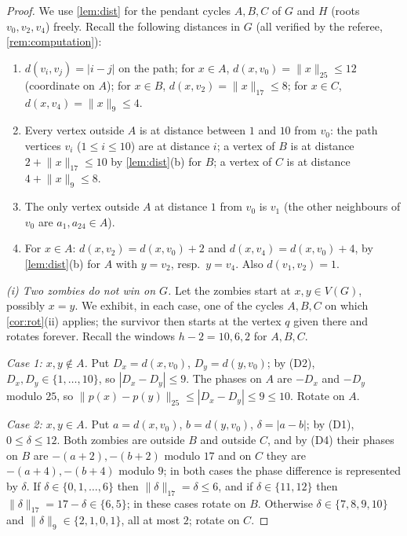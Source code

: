 \documentclass[11pt,a4paper]{article}
\theoremstyle{plain}
\theoremstyle{definition}
\theoremstyle{remark}
\providecommand{\tightlist}{\setlength{\itemsep}{0pt}\setlength{\parskip}{0pt}}
\newcommand{\cyc}[2]{\lVert #1\rVert_{#2}}
\newcommand{\dist}{d}
\begin{document}
\label{pf:main}
\thmmain*
\begin{proof}
We use \cref{lem:dist} for the pendant cycles $A,B,C$ of $G$ and $H$ (roots $v_0,v_2,v_4$) freely. Recall the following distances in $G$ (all verified by the referee, \cref{rem:computation}):
\begin{enumerate}[label=(D\arabic*)]\tightlist
\item $\dist(v_i,v_j)=|i-j|$ on the path; for $x\in A$, $\dist(x,v_0)=\cyc{x}{25}\le12$ (coordinate on $A$); for $x\in B$, $\dist(x,v_2)=\cyc{x}{17}\le8$; for $x\in C$, $\dist(x,v_4)=\cyc{x}{9}\le4$.
\item Every vertex outside $A$ is at distance between $1$ and $10$ from $v_0$: the path vertices $v_i$ ($1\le i\le10$) are at distance $i$; a vertex of $B$ is at distance $2+\cyc{x}{17}\le10$ by \cref{lem:dist}(b) for $B$; a vertex of $C$ is at distance $4+\cyc{x}{9}\le8$.
\item The only vertex outside $A$ at distance $1$ from $v_0$ is $v_1$ (the other neighbours of $v_0$ are $a_1,a_{24}\in A$).
\item For $x\in A$: $\dist(x,v_2)=\dist(x,v_0)+2$ and $\dist(x,v_4)=\dist(x,v_0)+4$, by \cref{lem:dist}(b) for $A$ with $y=v_2$, resp.\ $y=v_4$. Also $\dist(v_1,v_2)=1$.
\end{enumerate}

\emph{(i) Two zombies do not win on $G$.} Let the zombies start at $x,y\in V(G)$, possibly $x=y$. We exhibit, in each case, one of the cycles $A,B,C$ on which \cref{cor:rot}(ii) applies; the survivor then starts at the vertex $q$ given there and rotates forever. Recall the windows $h-2=10,6,2$ for $A,B,C$.

\emph{Case 1: $x,y\notin A$.} Put $D_x=\dist(x,v_0)$, $D_y=\dist(y,v_0)$; by (D2), $D_x,D_y\in\{1,\dots,10\}$, so $|D_x-D_y|\le9$. The phases on $A$ are $-D_x$ and $-D_y$ modulo $25$, so $\cyc{p(x)-p(y)}{25}\le|D_x-D_y|\le9\le10$. Rotate on $A$.

\emph{Case 2: $x,y\in A$.} Put $a=\dist(x,v_0)$, $b=\dist(y,v_0)$, $\delta=|a-b|$; by (D1), $0\le\delta\le12$. Both zombies are outside $B$ and outside $C$, and by (D4) their phases on $B$ are $-(a+2),-(b+2)$ modulo $17$ and on $C$ they are $-(a+4),-(b+4)$ modulo $9$; in both cases the phase difference is represented by $\delta$. If $\delta\in\{0,1,\dots,6\}$ then $\cyc{\delta}{17}=\delta\le6$, and if $\delta\in\{11,12\}$ then $\cyc{\delta}{17}=17-\delta\in\{6,5\}$; in these cases rotate on $B$. Otherwise $\delta\in\{7,8,9,10\}$ and $\cyc{\delta}{9}\in\{2,1,0,1\}$, all at most $2$; rotate on $C$.


\end{proof}
\end{document}
